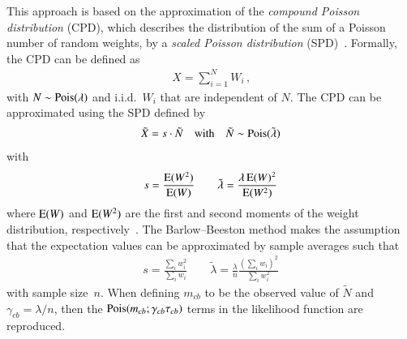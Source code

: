This approach is based on the approximation of the \emph{compound Poisson
  distribution} (CPD), which describes the distribution of the sum of a Poisson
number of random weights, by a \emph{scaled Poisson distribution}
(SPD)~\cite{Bohm:2013gla}. Formally, the CPD can be defined as
\begin{align*}
  X = \sum_{i = 1}^{N} W_i \,\text{,}  %
\end{align*}
with $N \sim \operatorname{Pois}(\lambda)$ and i.i.d.\ $W_i$ that are independent of $N$. The
CPD can be approximated using the SPD defined by
\begin{align*}
  \tilde{X} = s \cdot \tilde{N} \quad \text{with} \quad \tilde{N} \sim \operatorname{Pois}(\tilde{\lambda})
\end{align*}
with
\begin{align*}
  s = \frac{\operatorname{E}(W^2)}{\operatorname{E}(W)} \qquad \tilde{\lambda} = \frac{\lambda \operatorname{E}(W)^2}{\operatorname{E}(W^2)}
\end{align*}
where $\operatorname{E}(W)$ and $\operatorname{E}(W^2)$ are the first and second moments of the
weight distribution, respectively~\cite{Bohm:2013gla}. The Barlow--Beeston
method makes the assumption that the expectation values can be approximated by
sample averages such that
\begin{align*}
  s = \frac{\sum_i w_i^2}{\sum_i w_i} \qquad \tilde{\lambda} = \frac{\lambda}{n} \frac{(\sum_i w_i)^2}{\sum_i w_i^2}
\end{align*}
with sample size~$n$. When defining $m_{cb}$ to be the observed value of
$\tilde{N}$ and $\gamma_{cb} = \lambda / n$, then the
$\operatorname{Pois}(m_{cb}; \gamma_{cb} \tau_{cb})$ terms in the likelihood function are
reproduced.


